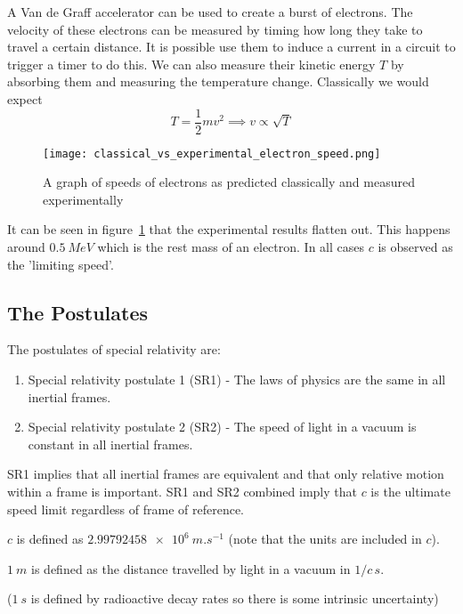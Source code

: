 \documentclass{article}
\begin{document}
    A Van de Graff accelerator can be used to create a burst of electrons.
    The velocity of these electrons can be measured by timing how long they take to travel a certain distance.
    It is possible  use them to induce a current in a circuit to trigger a timer to do this.
    We can also measure their kinetic energy \(T\) by absorbing them and  measuring the temperature change.
    Classically we would expect
    \[T=\frac{1}{2}mv^2\implies v\propto \sqrt{T}\]
    
    \begin{figure}[ht]
        \centering
        \texttt{[image: classical\_vs\_experimental\_electron\_speed.png]}
        \caption{A graph of speeds of electrons as predicted classically and measured experimentally}
        \label{fig:classical vs experimental electron speeds}
    \end{figure}

    It can be seen in figure~\ref{fig:classical vs experimental electron speeds} that the experimental results flatten out. 
    This happens around \(\SI{0.5}{MeV}\) which is the rest mass of an electron.
    In all cases \(c\) is observed as the 'limiting speed'.
    
    \subsection{The Postulates}
    The postulates of special relativity are:
    \begin{enumerate}
        \item Special relativity postulate 1 (SR1) - The laws of physics are the same in all inertial frames.
        \item Special relativity postulate 2 (SR2) - The speed of light in a vacuum is constant in all inertial frames.
    \end{enumerate}

    SR1 implies that all inertial frames are equivalent and that only relative motion within a frame is important.
    SR1 and SR2 combined imply that \(c\) is the ultimate speed limit regardless of frame of reference.
    
    \(c\) is defined as \(\SI{2.99792458e6}{m.s^{-1}}\) (note that the units are included in \(c\)).
    
    \(\SI{1}{m}\) is defined as the distance travelled by light in a vacuum in \(1/c\,\si{s}\).
    
    (\(\SI{1}{s}\) is defined by radioactive decay rates so there is some intrinsic uncertainty)
    
\end{document}
